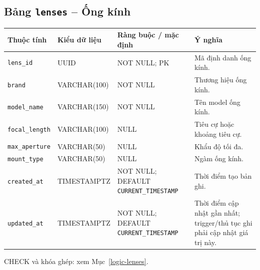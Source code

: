 \subsection{Bảng \texttt{lenses} -- Ống kính}
\label{dictionary-lenses}
\begingroup
\footnotesize
\setlength{\tabcolsep}{3pt}
\begin{longtable}{>{\raggedright\arraybackslash}p{3.1cm}>{\raggedright\arraybackslash}p{2.5cm}>{\raggedright\arraybackslash}p{3.7cm}>{\raggedright\arraybackslash}p{4.3cm}}
\toprule
Thuộc tính & Kiểu dữ liệu & Ràng buộc / mặc định & Ý nghĩa \\
\midrule
\endhead
\texttt{lens\_\allowbreak{}id} & UUID & NOT NULL; PK & Mã định danh ống kính. \\
\texttt{brand} & VARCHAR(100) & NOT NULL & Thương hiệu ống kính. \\
\texttt{model\_\allowbreak{}name} & VARCHAR(150) & NOT NULL & Tên model ống kính. \\
\texttt{focal\_\allowbreak{}length} & VARCHAR(100) & NULL & Tiêu cự hoặc khoảng tiêu cự. \\
\texttt{max\_\allowbreak{}aperture} & VARCHAR(50) & NULL & Khẩu độ tối đa. \\
\texttt{mount\_\allowbreak{}type} & VARCHAR(50) & NULL & Ngàm ống kính. \\
\texttt{created\_\allowbreak{}at} & TIMESTAMPTZ & NOT NULL; DEFAULT \texttt{CURRENT\_\allowbreak{}TIMESTAMP} & Thời điểm tạo bản ghi. \\
\texttt{updated\_\allowbreak{}at} & TIMESTAMPTZ & NOT NULL; DEFAULT \texttt{CURRENT\_\allowbreak{}TIMESTAMP} & Thời điểm cập nhật gần nhất; trigger/thủ tục ghi phải cập nhật giá trị này. \\
\bottomrule
\end{longtable}
\endgroup
CHECK và khóa ghép: xem Mục~\ref{logic-lenses}.
